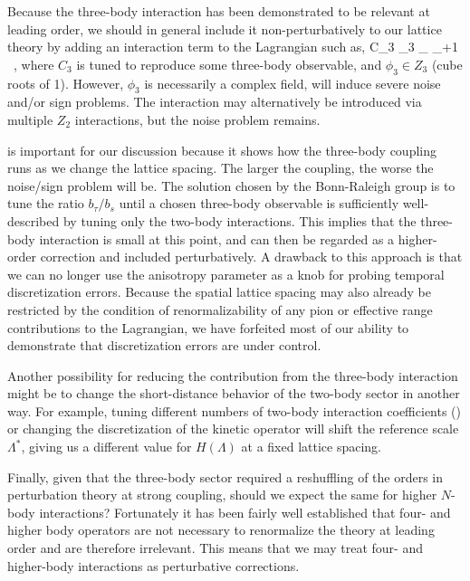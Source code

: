 Because the three-body interaction has been demonstrated to be relevant at leading order, we should in general include it non-perturbatively to our lattice theory by adding an interaction term to the Lagrangian such as,
\beq
C_3 \phi_3 \psidag_{\tau} \psi_{\tau+1} \ ,
\eeq
where $C_3$ is tuned to reproduce some three-body observable, and $\phi_3 \in Z_3$ (cube roots of 1). However, $\phi_3$ is necessarily a complex field, will induce severe noise and/or sign problems. The interaction may alternatively be introduced via multiple $Z_2$ interactions, but the noise problem remains.

 is important for our discussion because it shows how the three-body coupling runs as we change the lattice spacing. The larger the coupling, the worse the noise/sign problem will be. The solution chosen by the Bonn-Raleigh group is to tune the ratio $b_{\tau}/b_s$ until a chosen three-body observable is sufficiently well-described by tuning only the two-body interactions. This implies that the three-body interaction is small at this point, and can then be regarded as a higher-order correction and included perturbatively. A drawback to this approach is that we can no longer use the anisotropy parameter as a knob for probing temporal discretization errors. Because the spatial lattice spacing may also already be restricted by the condition of renormalizability of any pion or effective range contributions to the Lagrangian, we have forfeited most of our ability to demonstrate that discretization errors are under control.

Another possibility for reducing the contribution from the three-body interaction might be to change the short-distance behavior of the two-body sector in another way. For example, tuning different numbers of two-body interaction coefficients () or changing the discretization of the kinetic operator will shift the reference scale $\Lambda^*$, giving us a different value for $H(\Lambda)$ at a fixed lattice spacing.

Finally, given that the three-body sector required a reshuffling of the orders in perturbation theory at strong coupling, should we expect the same for higher $N$-body interactions? Fortunately it has been fairly well established that four- and higher body operators are not necessary to renormalize the theory at leading order and are therefore irrelevant. This means that we may treat four- and higher-body interactions as perturbative corrections.

